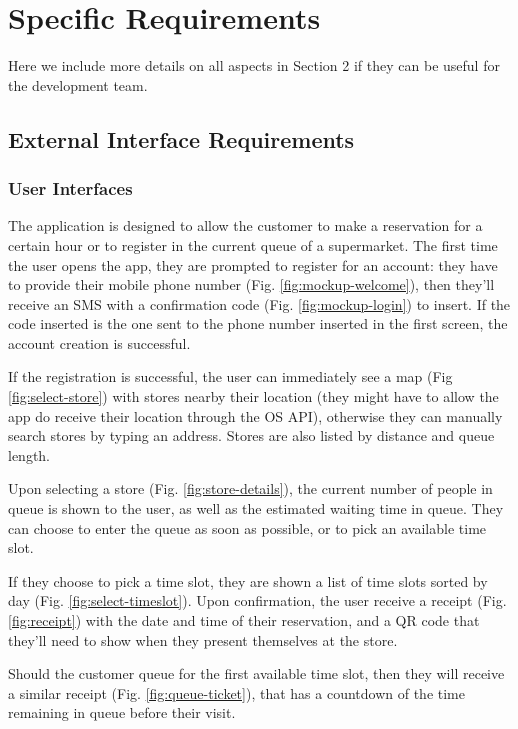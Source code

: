 \section{Specific Requirements}\label{sec:spec_req}

Here we include more details on all aspects in Section 2 if they
can be useful for the development team. 

\subsection{External Interface Requirements}
\subsubsection{User Interfaces}

The application is designed to allow the customer to make a reservation for a certain hour
or to register in the current queue of a supermarket. The first time the user opens the app,
they are prompted to register for an account: they have to provide their mobile phone number
(Fig. \ref{fig:mockup-welcome}), then they'll receive an SMS with a confirmation code
(Fig. \ref{fig:mockup-login}) to insert.
If the code inserted is the one sent to the phone number inserted in the first screen, the
account creation is successful.

If the registration is successful, the user can immediately see a map (Fig \ref{fig:select-store})
with stores nearby their location (they might have to allow the app do receive their location through
the OS API), otherwise they can manually search stores by typing an address.
Stores are also listed by distance and queue length.

Upon selecting a store (Fig. \ref{fig:store-details}), the current number of people in queue is shown to the user,
as well as the estimated waiting time in queue. They can choose to enter the queue as soon as
possible, or to pick an available time slot.

If they choose to pick a time slot, they are shown a list of time slots sorted by day (Fig. \ref{fig:select-timeslot}).
Upon confirmation, the user receive a receipt (Fig. \ref{fig:receipt}) with the date and time of their reservation,
and a QR code that they'll need to show when they present themselves at the store.

Should the customer queue for the first available time slot, then they will receive a similar receipt (Fig. \ref{fig:queue-ticket}),
that has a countdown of the time remaining in queue before their visit.

